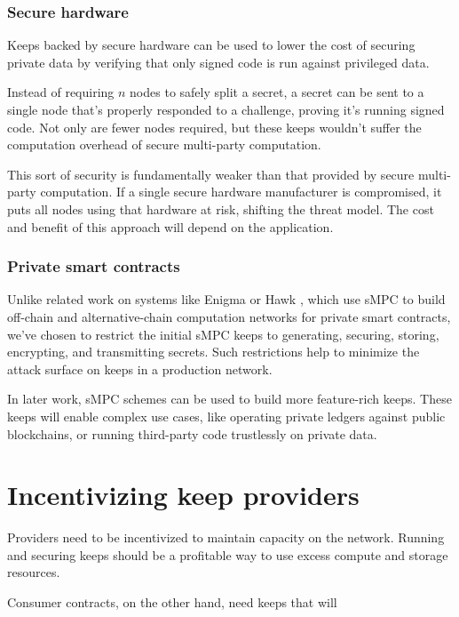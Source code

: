\documentclass[11pt]{article}
\begin{document}
\subsubsection{Secure hardware}

Keeps backed by secure hardware can be used to lower the cost of
securing private data by verifying that only signed code is run
against privileged data.

Instead of requiring $n$ nodes to safely split a secret, a secret can
be sent to a single node that's properly responded to a challenge,
proving it's running signed code. Not only are fewer nodes required,
but these keeps wouldn't suffer the computation overhead of secure
multi-party computation.

This sort of security is fundamentally weaker than that provided by
secure multi-party computation. If a single secure hardware
manufacturer is compromised, it puts all nodes using that hardware at
risk, shifting the threat model. The cost and benefit of this approach
will depend on the application.

\subsubsection{Private smart contracts}

Unlike related work on systems like Enigma \cite{enigma} or Hawk
\cite{hawk}, which use sMPC to build off-chain and alternative-chain
computation networks for private smart contracts, we've chosen to
restrict the initial sMPC keeps to generating, securing, storing,
encrypting, and transmitting secrets. Such restrictions help to
minimize the attack surface on keeps in a production network.

In later work, sMPC schemes can be used to build more feature-rich
keeps. These keeps will enable complex use cases, like operating
private ledgers against public blockchains, or running third-party
code trustlessly on private data.

\section{Incentivizing keep providers} \label{incentivizingProviders}

Providers need to be incentivized to maintain capacity on the network.
Running and securing keeps should be a profitable way to use excess
compute and storage resources.

Consumer contracts, on the other hand, need keeps that will
\end{document}
